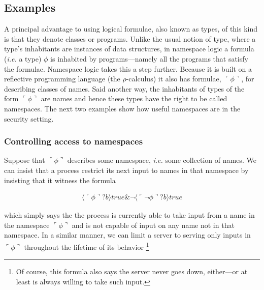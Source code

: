 \documentclass[]{amsart}
\newcommand{\lpquote}{\ulcorner}
\newcommand{\rpquote}{\urcorner}
\newcommand{\ptrue}{\mathbin{true}}
\newcommand{\pquotep}[1]{\lpquote #1 \rpquote}
\newcommand{\pprefix}[3]{\langle #1 ? #2 \rangle #3}
\theoremstyle{definition}
\theoremstyle{remark}
\numberwithin{equation}{subsection}
\newcommand{\pic}{$\pi$-calculus}
\newcommand{\rhoc}{$\rho$-calculus}
\begin{document}

\subsection{Examples}

A principal advantage to using logical formulae, also known as types, of this
kind is that they denote classes or programs. Unlike the usual notion
of type, where a type's inhabitants are instances of data structures,
in namespace logic a formula ({\em i.e.} a type) $\phi$ is inhabited by
programs---namely all the programs that satisfy the
formulae. Namespace logic takes this a step further. Because it is
built on a reflective programming language (the \rhoc) it also has
formulae, $\pquotep{\phi}$, for describing classes of names. Said
another way, the inhabitants of types of the form $\pquotep{\phi}$ are
names and hence these types have the right to be called
namespaces. The next two examples show how useful namespaces are in
the security setting.

\subsubsection{Controlling access to namespaces}
\label{namespace}
Suppose that $\pquotep{\phi}$ describes some namespace, {\em i.e.} some
collection of names. We can insist that a process restrict its next
input to names in that namespace by insisting that it witness the formula

\begin{eqnarray}
  \pprefix{\pquotep{\phi}}{b}{\ptrue} \& \neg \pprefix{\pquotep{\neg \phi}}{b}{\ptrue} \nonumber
\end{eqnarray}

\noindent which simply says the the process is currently able to take input from
a name in the namespace $\pquotep{\phi}$ and is not capable of input on
any name not in that namespace. In a similar manner, we can limit a
server to serving only inputs in $\pquotep{\phi}$ throughout the
lifetime of its behavior \footnote{Of course, this formula also says
the server never goes down, either---or at least is always willing
to take such input.}
\end{document}
